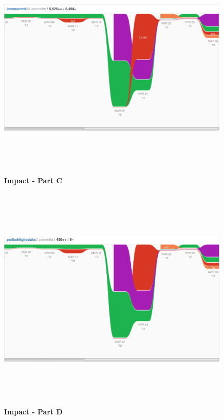 \begin{figure}[H]
  \centering
    \includegraphics[height= 11cm, width=17cm]{project/images/GitHub/impact-muneeb}
  \caption{\textbf{Impact - Part C}}
\end{figure}
\vspace{1cm}
\begin{figure}[H]
  \centering
    \includegraphics[height= 11cm, width=17cm]{project/images/GitHub/impact-parikshit}
  \caption{\textbf{Impact - Part D}}
\end{figure}
 




